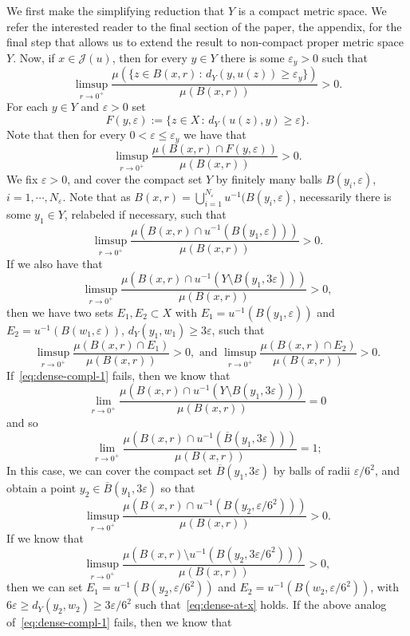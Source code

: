 \documentclass[11pt, letterpaper]{amsart} %
\newcommand*{\eps}{\varepsilon}
\numberwithin{equation}{section}
\theoremstyle{plain}
\theoremstyle{definition}
\begin{document}
{We first make the simplifying reduction that $Y$ is a compact metric space. 
We refer the interested reader to the final section of the paper, the appendix, for the final step that 
allows us to extend the result to non-compact proper metric space $Y$.
Now, if $x\in \mathcal{J}(u)$, 
then for every $y\in Y$
there is some $\eps_y>0$ such that 
\[
\limsup_{r\to 0^+}\frac{\mu(\{z\in B(x,r)\, :\, d_Y(y, u(z))\ge \eps_y\})}{\mu(B(x,r))}>0.
\]
For each $y\in Y$ and $\eps>0$ set 
\begin{equation}\label{eq:Eyeps}
F(y,\eps):=\{z\in X\, :\, d_Y(u(z),y)\ge \eps\}.
\end{equation}
Note that then for every $0<\eps\le \eps_y$ we have that 
\[
\limsup_{r\to 0^+}\frac{\mu(B(x,r)\cap F(y,\eps))}{\mu(B(x,r))}>0.
\]
We fix $\eps>0$, and cover the compact set $Y$ by finitely many balls $B(y_i,\eps)$, $i=1,\cdots, N_\eps$. Note that as
$B(x,r)=\bigcup_{i=1}^{N_\eps}u^{-1}(B(y_i,\eps)$, necessarily there is some $y_1\in Y$, relabeled if necessary, such that
\[
\limsup_{r\to 0^+}\frac{\mu(B(x,r)\cap u^{-1}(B(y_1,\eps)))}{\mu(B(x,r))}>0.
\]
If we also have that 
\begin{equation}\label{eq:dense-compl-1}
\limsup_{r\to 0^+}\frac{\mu(B(x,r)\cap u^{-1}(Y\setminus B(y_1,3\eps)))}{\mu(B(x,r))}>0,
\end{equation}
then we have two sets $E_1,E_2\subset X$ with $E_1=u^{-1}(B(y_1,\eps))$ and $E_2=u^{-1}(B(w_1,\eps))$,
$d_Y(y_1,w_1)\ge 3\eps$, such that 
\begin{equation}\label{eq:dense-at-x}
\limsup_{r\to 0^+}\frac{\mu(B(x,r)\cap E_1)}{\mu(B(x,r))}>0,\text{ and }
\limsup_{r\to 0^+}\frac{\mu(B(x,r)\cap E_2)}{\mu(B(x,r))}>0.
\end{equation}
If~\eqref{eq:dense-compl-1} fails, then we know that 
\[
\lim_{r\to 0^+}\frac{\mu(B(x,r)\cap u^{-1}(Y\setminus B(y_1,3\eps)))}{\mu(B(x,r))}=0
\]
and so 
\[
\lim_{r\to 0^+}\frac{\mu(B(x,r)\cap u^{-1}(\overline{B}(y_1,3\eps)))}{\mu(B(x,r))}=1;
\]
In this case, we can cover the compact set $\overline{B}(y_1,3\eps)$ by balls of radii $\eps/6^2$, and obtain
a point $y_2\in \overline{B}(y_1,3\eps)$ so that
\[
\limsup_{r\to 0^+}\frac{\mu(B(x,r)\cap u^{-1}(B(y_2,\eps/6^2)))}{\mu(B(x,r))}>0.
\]
If we know that 
\[
\limsup_{r\to 0^+}\frac{\mu(B(x,r)\setminus u^{-1}(B(y_2,3\eps/6^2)))}{\mu(B(x,r))}>0,
\]
then we can set $E_1=u^{-1}(B(y_2,\eps/6^2))$ and $E_2=u^{-1}(B(w_2,\eps/6^2))$, with
$6\eps\ge d_Y(y_2,w_2)\ge 3\eps/6^2$ 
such that~\eqref{eq:dense-at-x} holds. If the above analog of~\eqref{eq:dense-compl-1}
fails, then we know that
}
\end{document}
